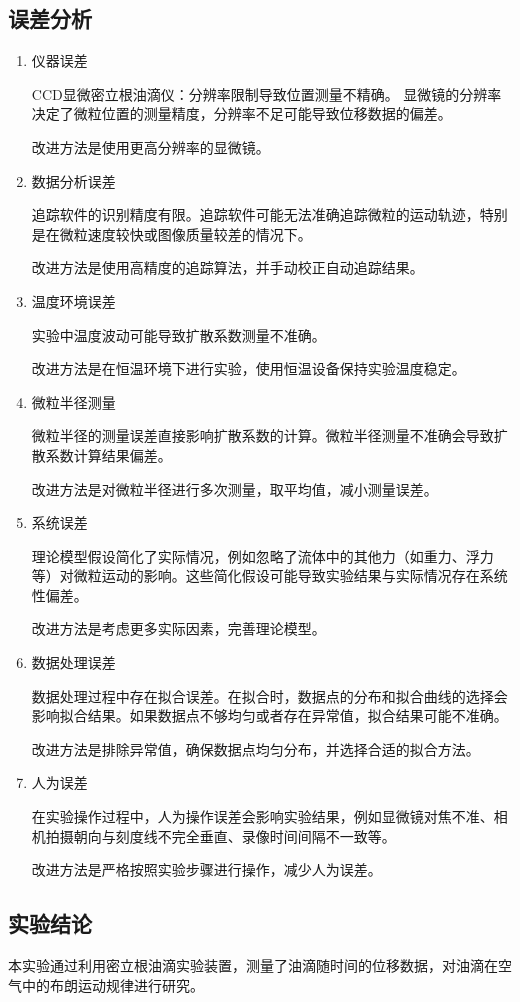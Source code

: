 \documentclass[12pt,a4paper,UTF8]{ctexart}
\begin{document}
\subsection*{误差分析}
\begin{enumerate}
	\item 仪器误差

CCD显微密立根油滴仪：分辨率限制导致位置测量不精确。
显微镜的分辨率决定了微粒位置的测量精度，分辨率不足可能导致位移数据的偏差。

改进方法是使用更高分辨率的显微镜。
	\item 数据分析误差

追踪软件的识别精度有限。追踪软件可能无法准确追踪微粒的运动轨迹，特别是在微粒速度较快或图像质量较差的情况下。

改进方法是使用高精度的追踪算法，并手动校正自动追踪结果。
	\item 温度环境误差

实验中温度波动可能导致扩散系数测量不准确。

改进方法是在恒温环境下进行实验，使用恒温设备保持实验温度稳定。
	\item 微粒半径测量

微粒半径的测量误差直接影响扩散系数的计算。微粒半径测量不准确会导致扩散系数计算结果偏差。

改进方法是对微粒半径进行多次测量，取平均值，减小测量误差。

	\item 系统误差

理论模型假设简化了实际情况，例如忽略了流体中的其他力（如重力、浮力等）对微粒运动的影响。这些简化假设可能导致实验结果与实际情况存在系统性偏差。

改进方法是考虑更多实际因素，完善理论模型。
	
	\item 数据处理误差

数据处理过程中存在拟合误差。在拟合时，数据点的分布和拟合曲线的选择会影响拟合结果。如果数据点不够均匀或者存在异常值，拟合结果可能不准确。

改进方法是排除异常值，确保数据点均匀分布，并选择合适的拟合方法。

	\item 人为误差

在实验操作过程中，人为操作误差会影响实验结果，例如显微镜对焦不准、相机拍摄朝向与刻度线不完全垂直、录像时间间隔不一致等。

改进方法是严格按照实验步骤进行操作，减少人为误差。
\end{enumerate}
\subsection*{实验结论}
本实验通过利用密立根油滴实验装置，测量了油滴随时间的位移数据，对油滴在空气中的布朗运动规律进行研究。
\end{document}
